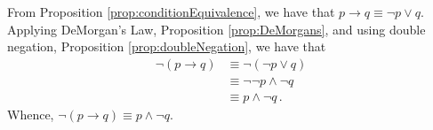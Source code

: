 \guard










\begin{exmp}
\label{exmp:conditionalNegation}
  From Proposition \ref{prop:conditionEquivalence}, we have that $p\rightarrow q \equiv \neg p \vee q$.
  Applying DeMorgan's Law, Proposition \ref{prop:DeMorgans}, and using double negation, Proposition \ref{prop:doubleNegation}, we have that
  \begin{align*}
    \neg (p \rightarrow q)  &\equiv \neg( \neg p \vee q ) \\
                            &\equiv \neg\neg p \wedge \neg q \\
                            &\equiv p \wedge \neg q\,.
  \end{align*}
  Whence, $ \neg( p\rightarrow q ) \equiv p \wedge \neg q $.
\end{exmp}
